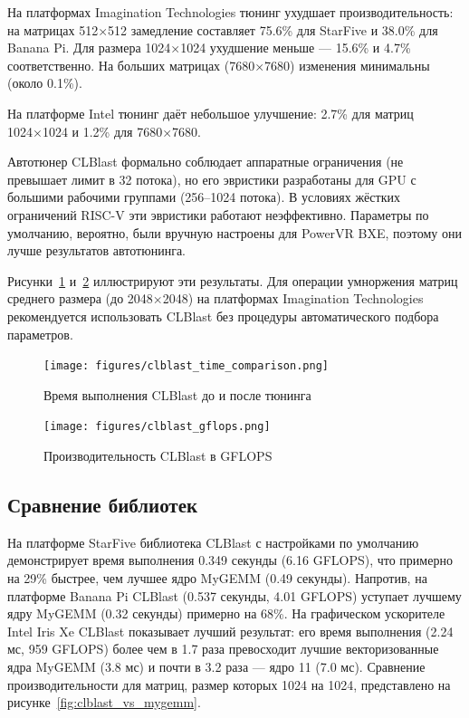 На платформах Imagination Technologies тюнинг ухудшает производительность: на матрицах 512×512 замедление составляет 75.6\% для StarFive и 38.0\% для Banana Pi. Для размера 1024×1024 ухудшение меньше --- 15.6\% и 4.7\% соответственно. На больших матрицах (7680×7680) изменения минимальны (около 0.1\%). 

На платформе Intel тюнинг даёт небольшое улучшение: 2.7\% для матриц 1024×1024 и 1.2\% для 7680×7680. 

Автотюнер CLBlast формально соблюдает аппаратные ограничения (не превышает лимит в 32 потока), но его эвристики разработаны для GPU с большими рабочими группами (256--1024 потока). В условиях жёстких ограничений RISC-V эти эвристики работают неэффективно. Параметры по умолчанию, вероятно, были вручную настроены для PowerVR BXE, поэтому они лучше результатов автотюнинга.

Рисунки~\ref{fig:clblast_time} и~\ref{fig:clblast_gflops} иллюстрируют эти результаты. Для операции умноржения матриц среднего размера (до 2048×2048) на платформах Imagination Technologies рекомендуется использовать CLBlast без процедуры автоматического подбора параметров.

\begin{figure}[h!]
\centering
\texttt{[image: figures/clblast\_time\_comparison.png]}
\caption{Время выполнения CLBlast до и после тюнинга}
\label{fig:clblast_time}
\end{figure}

\begin{figure}[h!]
\centering
\texttt{[image: figures/clblast\_gflops.png]}
\caption{Производительность CLBlast в GFLOPS}
\label{fig:clblast_gflops}
\end{figure}

\subsection{Сравнение библиотек}

На платформе StarFive библиотека CLBlast с настройками по умолчанию демонстрирует время выполнения 0.349 секунды (6.16 GFLOPS), что примерно на 29\% быстрее, чем лучшее ядро MyGEMM (0.49 секунды). Напротив, на платформе Banana Pi CLBlast (0.537 секунды, 4.01 GFLOPS) уступает лучшему ядру MyGEMM (0.32 секунды) примерно на 68\%. На графическом ускорителе Intel Iris Xe CLBlast показывает лучший результат: его время выполнения (2.24 мс, 959 GFLOPS) более чем в 1.7 раза превосходит лучшие векторизованные ядра MyGEMM (3.8 мс) и почти в 3.2 раза — ядро 11 (7.0 мс). Сравнение производительности для матриц, размер которых 1024 на 1024, представлено на рисунке~\ref{fig:clblast_vs_mygemm}.

